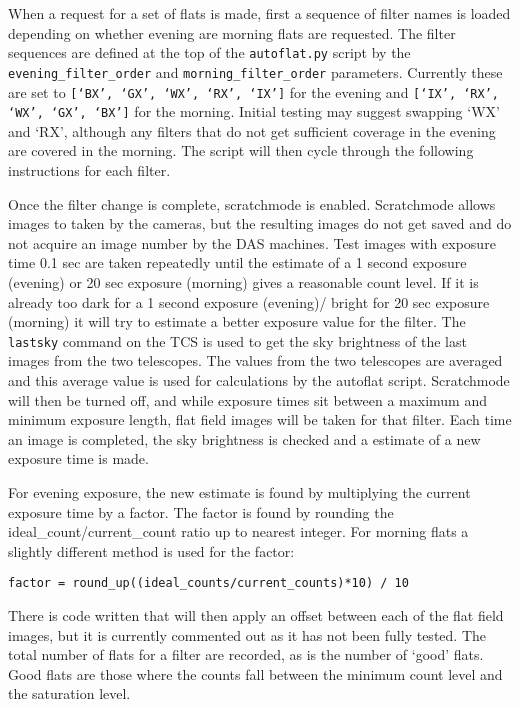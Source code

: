 \documentclass[a4paper,12pt]{article}
\begin{document}
When a request for a set of flats is made, first a sequence of filter names is loaded depending on whether evening are morning flats are requested. The filter sequences are defined at the top of the {\tt autoflat.py} script by the {\tt evening\_filter\_order} and {\tt morning\_filter\_order} parameters. Currently these are set to {\tt [`BX', `GX', `WX', `RX', `IX']} for the evening and {\tt [`IX', `RX', `WX', `GX', `BX']} for the morning. Initial testing may suggest swapping `WX' and `RX', although any filters that do not get sufficient coverage in the evening are covered in the morning. The script will then cycle through the following instructions for each filter.

Once the filter change is complete, scratchmode is enabled. Scratchmode allows images to taken by the cameras, but the resulting images do not get saved and do not acquire an image number by the DAS machines. Test images with exposure time 0.1 sec are taken repeatedly until the estimate of a 1 second exposure (evening) or 20 sec exposure (morning) gives a reasonable count level. If it is already too dark for a 1 second exposure (evening)/ bright for 20 sec exposure (morning) it will try to estimate a better exposure value for the filter. The {\tt lastsky} command on the TCS is used to get the sky brightness of the last images from the two telescopes. The values from the two telescopes are averaged and this average value is used for calculations by the autoflat script.  Scratchmode will then be turned off, and while exposure times sit between a maximum and minimum exposure length, flat field images will be taken for that filter. Each time an image is completed, the sky brightness is checked and a estimate of a new exposure time is made.

For evening exposure, the new estimate is found by multiplying the current exposure time by a factor. The factor is found by rounding the ideal\_count/current\_count ratio up to nearest integer. For morning flats a slightly different method is used for the factor:
\begin{verbatim}
factor = round_up((ideal_counts/current_counts)*10) / 10
\end{verbatim}

There is code written that will then apply an offset between each of the flat field images, but it is currently commented out as it has not been fully tested. The total number of flats for a filter are recorded, as is the number of `good' flats. Good flats are those where the counts fall between the minimum count level and the saturation level.
\end{document}
